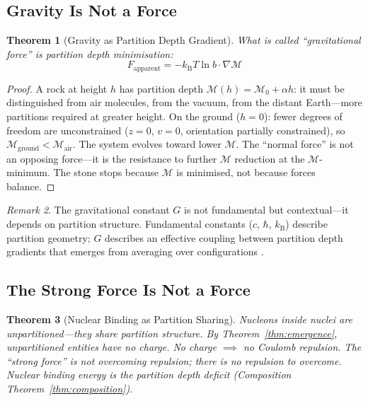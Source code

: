 \documentclass[11pt,twocolumn,a4paper]{article}
\newtheorem{theorem}{Theorem}[section]
\theoremstyle{definition}
\theoremstyle{remark}
\newtheorem{remark}[theorem]{Remark}
\newcommand{\kB}{k_{\mathrm{B}}}
\newcommand{\Depth}{\mathcal{M}}
\begin{document}
\subsection{Gravity Is Not a Force}

\begin{theorem}[Gravity as Partition Depth Gradient]
\label{thm:gravity}
What is called ``gravitational force'' is partition depth minimisation:
\begin{equation}
F_{\mathrm{apparent}} = -\kB T \ln b \cdot \nabla\Depth
\end{equation}
\end{theorem}

\begin{proof}
A rock at height $h$ has partition depth $\Depth(h) = \Depth_0 + \alpha h$: it must be distinguished from air molecules, from the vacuum, from the distant Earth---more partitions required at greater height. On the ground ($h = 0$): fewer degrees of freedom are unconstrained ($z = 0$, $v = 0$, orientation partially constrained), so $\Depth_{\mathrm{ground}} < \Depth_{\mathrm{air}}$. The system evolves toward lower $\Depth$. The ``normal force'' is not an opposing force---it is the resistance to further $\Depth$ reduction at the $\Depth$-minimum. The stone stops because $\Depth$ is minimised, not because forces balance.
\end{proof}

\begin{remark}
The gravitational constant $G$ is not fundamental but contextual---it depends on partition structure. Fundamental constants ($c$, $\hbar$, $\kB$) describe partition geometry; $G$ describes an effective coupling between partition depth gradients that emerges from averaging over configurations \citep{einstein1916, eotvos1922}.
\end{remark}

\subsection{The Strong Force Is Not a Force}

\begin{theorem}[Nuclear Binding as Partition Sharing]
\label{thm:strong}
Nucleons inside nuclei are unpartitioned---they share partition structure. By Theorem~\ref{thm:emergence}, unpartitioned entities have no charge. No charge $\implies$ no Coulomb repulsion. The ``strong force'' is not overcoming repulsion; there is no repulsion to overcome. Nuclear binding energy is the partition depth deficit (Composition Theorem~\ref{thm:composition}).
\end{theorem}
\end{document}
